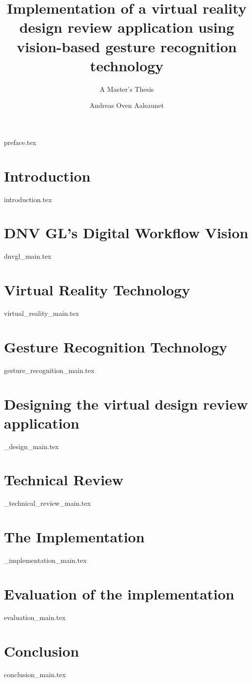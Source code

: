 \documentclass[UKenglish]{ifimaster}
\title{Implementation of a virtual reality design review application using vision-based gesture recognition technology}
\subtitle{A Master's Thesis}
\author{Andreas Oven Aalsaunet}
\begin{document}
\duoforside[dept={Department of Informatics}, program={Programming and Networks}, long]                                        

{preface.tex}

\frontmatter{}                 
\tableofcontents{}
\listoffigures{}
\listoftables{}

\mainmatter{}
  
\chapter{Introduction}  
{introduction.tex}

\chapter{DNV GL's Digital Workflow Vision}
{dnvgl_main.tex}

\chapter{Virtual Reality Technology}
{virtual_reality_main.tex}

\chapter{Gesture Recognition Technology}
{gesture_recognition_main.tex}

\chapter{Designing the virtual design review application}
{_design_main.tex}

\chapter{Technical Review}
{_technical_review_main.tex}

\chapter{The Implementation}
{_implementation_main.tex}

\chapter{Evaluation of the implementation}
{evaluation_main.tex}

\chapter{Conclusion}
{conclusion_main.tex}

\backmatter{}


\end{document}

